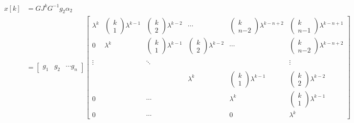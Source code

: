 \documentclass[twoside]{article}
\begin{document}
\begin{align*}
	x[k] &= G J^k G^{-1} g_2 \alpha_2 
	\\
	&= \left[ \begin{array}{ccc} g_1 & g_2 & \cdots g_n \end{array} \right] 
\left[  \begin{array}{cccccc} \lambda^k & \begin{pmatrix} k \\ 1 \end{pmatrix} \lambda^{k-1} & \begin{pmatrix} k \\ 2 \end{pmatrix}  \lambda^{k-2} 
& \cdots & \begin{pmatrix} k \\ n\mathrm{-}2 \end{pmatrix} \lambda^{k-n+2} & \begin{pmatrix} k \\ n\mathrm{-}1 \end{pmatrix} \lambda^{k-n+1}
\\ 0 & \lambda^k & \begin{pmatrix} k \\ 1 \end{pmatrix}  \lambda^{k-1} & \begin{pmatrix} k \\ 2 \end{pmatrix} \lambda^{k-2} & \cdots  & \begin{pmatrix} k \\ n\mathrm{-}2 \end{pmatrix} \lambda^{k-n+2}
\\ 
\\  \vdots &  & \ddots &  &  & \vdots \\ 
\\ 
& & & \lambda^k & \begin{pmatrix} k \\ 1 \end{pmatrix}  \lambda^{k-1} & \begin{pmatrix} k \\ 2 \end{pmatrix}  \lambda^{k-2} 
\\ 0 &  & \cdots  &  & \lambda^k & \begin{pmatrix} k \\ 1 \end{pmatrix}  \lambda^{k-1} \\
0 &  & \cdots &  & 0 & \lambda^k \end{array} \right]  

\end{align*}
\end{document}
